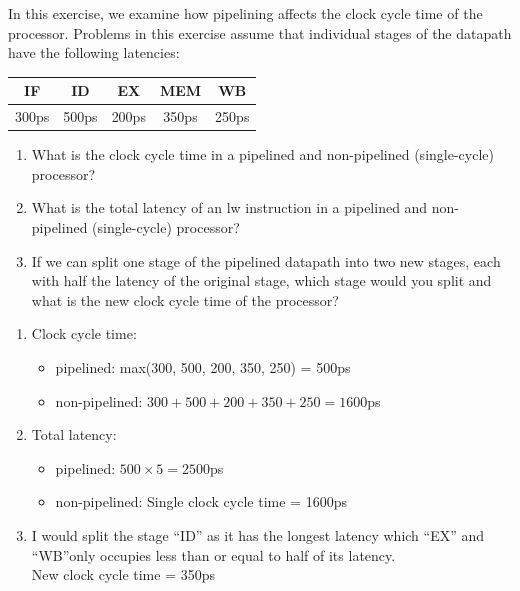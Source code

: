 \documentclass[12pt, a4paper]{article}
\begin{document}
\begin{q}{20}
In this exercise, we examine how pipelining affects the clock cycle time of the 
processor. Problems in this exercise assume that individual stages of the datapath 
have the following latencies:
\begin{center}
    \begin{tabular}{|c|c|c|c|c|}
        \hline
        \bf{IF} & \bf{ID} & \bf{EX} & \bf{MEM} & \bf{WB}\\
        \hline
        300ps & 500ps & 200ps & 350ps & 250ps\\
        \hline
    \end{tabular}
\end{center}
\begin{enumerate}
    \item What is the clock cycle time in a pipelined and non-pipelined (single-cycle) processor?
    \item What is the total latency of an lw instruction in a pipelined and non-pipelined
    (single-cycle) processor?
    \item If we can split one stage of the pipelined datapath into two new stages, each with
    half the latency of the original stage, which stage would you split and what is the
    new clock cycle time of the processor?
\end{enumerate}
\end{q}
\begin{ans}
    \begin{enumerate}
        \item Clock cycle time: 
            \begin{itemize}
                \item pipelined: max(300, 500, 200, 350, 250) = 500ps
                \item non-pipelined: $300+500+200+350+250=1600$ps
            \end{itemize}
        \item Total latency: 
            \begin{itemize}
                \item pipelined: $500 \times 5 = 2500$ps
                \item non-pipelined: Single clock cycle time = 1600ps
            \end{itemize}
        \item I would split the stage ``ID'' as it has the longest latency which ``EX'' and ``WB''only occupies less than or equal to half of its latency. \\
        New clock cycle time = 350ps
    \end{enumerate}
\end{ans}
\end{document}
